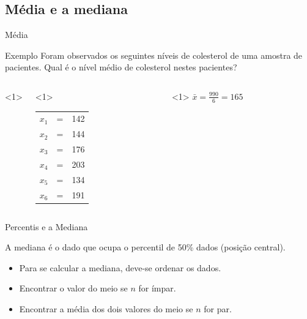 \documentclass{beamer}
\begin{document}
\subsection{Média e a mediana}

\begin{frame}{\scriptsize Média}
  \begin{exampleblock}{Exemplo}
    \footnotesize
    Foram observados os seguintes níveis de colesterol de uma amostra
    de pacientes. Qual é o nível médio de colesterol nestes pacientes?

    \begin{columns}<1>
      \begin{column}{5cm}<1>
        \begin{tabular}{ccc}
          $x_1$ &=&142\\
          $x_2$ &=&144\\
          $x_3$ &=&176\\
          $x_4$ &=&203\\
          $x_5$ &=&134\\
          $x_6$ &=&191\\
        \end{tabular}
      \end{column}
      \begin{column}{5cm}<1>
        $\bar{x} = \frac{990}{6} = 165$
      \end{column}
    \end{columns}
  \end{exampleblock}
\end{frame}

\begin{frame}{\scriptsize Percentis e a Mediana}
  \begin{block}
    A mediana é o dado que ocupa o percentil de 50\% dados (\alert{posição central}).
  \end{block}
  \begin{itemize}
    \footnotesize
  \item Para se calcular a mediana, deve-se ordenar os dados.
  \item Encontrar o valor do \alert{meio} se $n$ for ímpar.
  \item Encontrar a média dos dois valores do \alert{meio} se $n$ for par.
  \end{itemize}
\end{frame}
\end{document}
